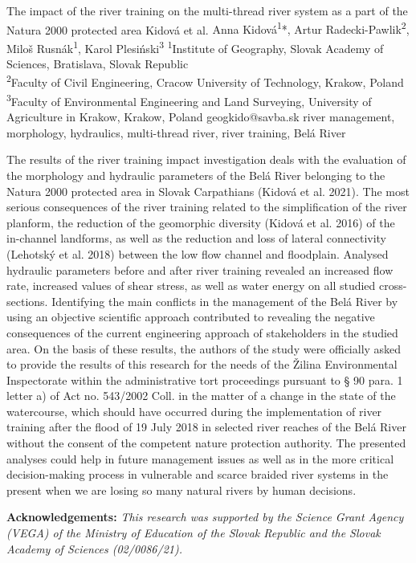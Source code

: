 \abstract
{The impact of the river training on the multi-thread river system as a part of the Natura 2000 protected area} 
{Kidová et al.} 
{Anna Kidová\textsuperscript{1}*, Artur Radecki-Pawlik\textsuperscript{2}, Miloš Rusnák\textsuperscript{1}, Karol Plesiński\textsuperscript{3}} 
{\TLtag} 
{
	\textsuperscript{1}Institute of Geography, Slovak Academy of Sciences, Bratislava, Slovak Republic\\
	\textsuperscript{2}Faculty of Civil Engineering, Cracow University of Technology, Krakow, Poland\\
	\textsuperscript{3}Faculty of Environmental Engineering and Land Surveying, University of Agriculture in Krakow, Krakow, Poland
}
{geogkido@savba.sk}  %
{river management, morphology, hydraulics, multi-thread river, river training, Belá River}
{The results of the river training impact investigation deals with the evaluation of the morphology and hydraulic parameters of the Belá River belonging to the Natura 2000 protected area in Slovak Carpathians (Kidová et al. 2021). The most serious consequences of the river training related to the simplification of the river planform, the reduction of the geomorphic diversity (Kidová et al. 2016) of the in-channel landforms, as well as the reduction and loss of lateral connectivity (Lehotský et al. 2018) between the low flow channel and floodplain. Analysed hydraulic parameters before and after river training revealed an increased flow rate, increased values of shear stress, as well as water energy on all studied cross-sections. Identifying the main conflicts in the management of the Belá River by using an objective scientific approach contributed to revealing the negative consequences of the current engineering approach of stakeholders in the studied area. On the basis of these results, the authors of the study were officially asked to provide the results of this research for the needs of the Žilina Environmental Inspectorate within the administrative tort proceedings pursuant to § 90 para. 1 letter a) of Act no. 543/2002 Coll. in the matter of a change in the state of the watercourse, which should have occurred during the implementation of river training after the flood of 19 July 2018 in selected river reaches of the Belá River without the consent of the competent nature protection authority. The presented analyses could help in future management issues as well as in the more critical decision-making process in vulnerable and scarce braided river systems in the present when we are losing so many natural rivers by human decisions.

\vspace{0.5em}
\noindent
\textbf{Acknowledgements:}
\textit{This research was supported by the Science Grant Agency (VEGA) of the Ministry of Education of the Slovak Republic and the Slovak Academy of Sciences (02/0086/21).}
}
